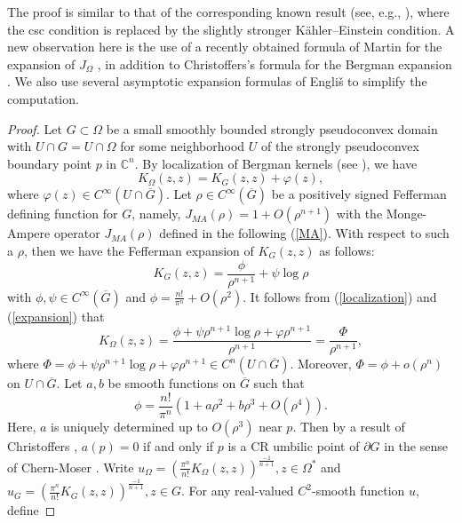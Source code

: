 \documentclass[a4paper,centertags,osxzneside,12pt]{amsart}
\numberwithin{equation}{section}
\begin{document}
The proof is similar to that of the corresponding known result (see, e.g., \cite{HX21,HL23}), where the csc condition is replaced by the slightly stronger K\"ahler--Einstein condition. A new observation here is the use of a recently obtained formula of Martin for the expansion of $J_\Omega$ \cite{Ma21}, in addition to Christoffers's formula for the Bergman expansion \cite{Ch81}. We also use several asymptotic expansion formulas of Engliš \cite{Eng08} to simplify the computation.
\begin{proof}
Let $G\subset\Omega$ be a small smoothly bounded  strongly pseudoconvex domain with $U\cap G=U\cap \Omega$ for some neighborhood $U$ of the strongly pseudoconvex boundary point $p$ in $\mathbb C^n$. By localization of Bergman kernels (see \cite{HHL26}), we have
\begin{equation}\label{localization}
    K_\Omega(z, z)=K_G(z, z)+\varphi(z),
\end{equation}
where $\varphi(z)\in C^\infty(U\cap\overline G)$. Let $\rho\in C^\infty(\overline G)$ be a positively signed Fefferman defining function for $G$, namely, $J_{MA}(\rho)=1+O(\rho^{n+1})$ with the Monge-Ampere operator $J_{MA}(\rho)$ defined in the following (\ref{MA}). With respect to such a $\rho$, then we have  the Fefferman expansion of $K_G(z, z)$ as follows:
\begin{equation}\label{expansion}
    K_G(z, z)=\frac{\phi}{\rho^{n+1}}+\psi\log\rho
\end{equation}
with $\phi, \psi\in C^\infty(\overline G)$ and $\phi=\frac{n!}{\pi^n}+O(\rho^2)$. It follows from (\ref{localization}) and (\ref{expansion}) that 
\begin{equation}\label{AP}
    K_{\Omega}(z, z)=\frac{\phi+\psi\rho^{n+1}\log\rho+\varphi\rho^{n+1}}{\rho^{n+1}}=\frac{\Phi}{\rho^{n+1}},
\end{equation}
where $\Phi=\phi+\psi\rho^{n+1}\log\rho+\varphi\rho^{n+1}\in C^n(U\cap\overline G)$. Moreover, $\Phi=\phi+o(\rho^n)$ on $U\cap\overline G$.
Let $a, b$ be smooth functions on $\overline G$ such that 
\begin{equation*}
    \phi=\frac{n!}{\pi^n}(1+a\rho^2+b\rho^3+O(\rho^4)).
\end{equation*}
Here, $a$ is uniquely determined up to $O(\rho^3)$ near $p$. Then by a result of Christoffers \cite{Ch81}, $a(p)=0$ if and only if $p$ is a CR umbilic point of $\partial G$ in the sense of Chern-Moser \cite{CM74}. Write $u_{\Omega}=(\frac{\pi^n}{n!}K_{\Omega}(z, z))^{\frac{-1}{n+1}}, z\in\Omega^\ast$ and $u_G=(\frac{\pi^n}{n!}K_{G}(z, z))^{\frac{-1}{n+1}}, z\in G$. For any real-valued  $C^2$-smooth function $u$, define

\end{proof}
\end{document}
